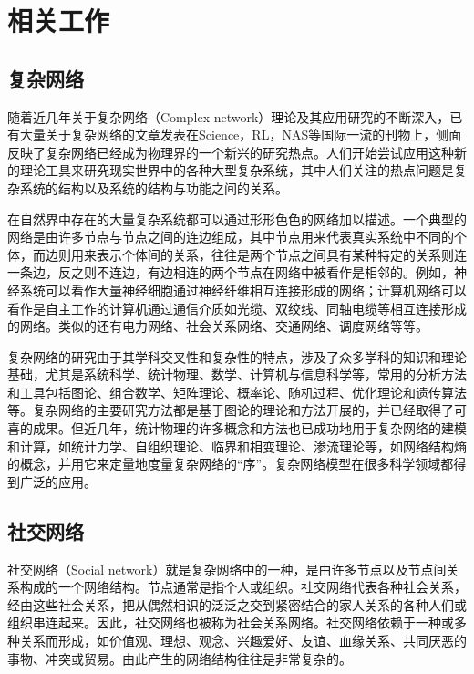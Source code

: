 \chapter{相关工作}
\section{复杂网络}

随着近几年关于复杂网络（Complex network）理论及其应用研究的不断深入，已有大量关于复杂网络的文章发表在Science，RL，NAS等国际一流的刊物上，侧面反映了复杂网络已经成为物理界的一个新兴的研究热点。人们开始尝试应用这种新的理论工具来研究现实世界中的各种大型复杂系统，其中人们关注的热点问题是复杂系统的结构以及系统的结构与功能之间的关系。

在自然界中存在的大量复杂系统都可以通过形形色色的网络加以描述。一个典型的网络是由许多节点与节点之间的连边组成，其中节点用来代表真实系统中不同的个体，而边则用来表示个体间的关系，往往是两个节点之间具有某种特定的关系则连一条边，反之则不连边，有边相连的两个节点在网络中被看作是相邻的。例如，神经系统可以看作大量神经细胞通过神经纤维相互连接形成的网络；计算机网络可以看作是自主工作的计算机通过通信介质如光缆、双绞线、同轴电缆等相互连接形成的网络。类似的还有电力网络、社会关系网络、交通网络、调度网络等等。

复杂网络的研究由于其学科交叉性和复杂性的特点，涉及了众多学科的知识和理论基础，尤其是系统科学、统计物理、数学、计算机与信息科学等，常用的分析方法和工具包括图论、组合数学、矩阵理论、概率论、随机过程、优化理论和遗传算法等。复杂网络的主要研究方法都是基于图论的理论和方法开展的，并已经取得了可喜的成果。但近几年，统计物理的许多概念和方法也已成功地用于复杂网络的建模和计算，如统计力学、自组织理论、临界和相变理论、渗流理论等，如网络结构熵的概念，并用它来定量地度量复杂网络的“序”。复杂网络模型在很多科学领域都得到广泛的应用。

\section{社交网络}

社交网络（Social network）就是复杂网络中的一种，是由许多节点以及节点间关系构成的一个网络结构。节点通常是指个人或组织。社交网络代表各种社会关系，经由这些社会关系，把从偶然相识的泛泛之交到紧密结合的家人关系的各种人们或组织串连起来。因此，社交网络也被称为社会关系网络。社交网络依赖于一种或多种关系而形成，如价值观、理想、观念、兴趣爱好、友谊、血缘关系、共同厌恶的事物、冲突或贸易。由此产生的网络结构往往是非常复杂的。

